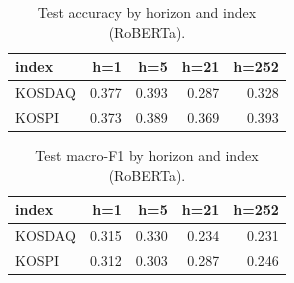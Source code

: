 \begin{table}[t]\centering
\caption{Test accuracy by horizon and index (RoBERTa).}
\begin{tabular}{lrrrr}
\toprule
index & h=1 & h=5 & h=21 & h=252 \\
\midrule
KOSDAQ & 0.377 & 0.393 & 0.287 & 0.328 \\
KOSPI & 0.373 & 0.389 & 0.369 & 0.393 \\
\bottomrule
\end{tabular}
\end{table}

\begin{table}[t]\centering
\caption{Test macro-F1 by horizon and index (RoBERTa).}
\begin{tabular}{lrrrr}
\toprule
index & h=1 & h=5 & h=21 & h=252 \\
\midrule
KOSDAQ & 0.315 & 0.330 & 0.234 & 0.231 \\
KOSPI & 0.312 & 0.303 & 0.287 & 0.246 \\
\bottomrule
\end{tabular}
\end{table}